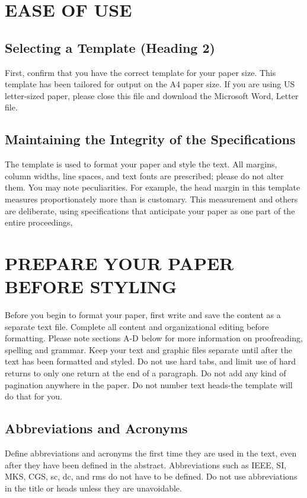 \documentclass[journal,onecolumn]{IEEEtran}
\begin{document}
\section{EASE OF USE}
\subsection{Selecting a Template (Heading 2)}
First, confirm that you have the correct template for your paper size. This template has been tailored for output on the A4 paper size. If you are using US letter-sized paper, please close this file and download the Microsoft Word, Letter file.	
\subsection{Maintaining the Integrity of the Specifications}
The template is used to format your paper and style the text. All margins, column widths, line spaces, and text fonts are prescribed; please do not alter them. You may note peculiarities. For example, the head margin in this template measures proportionately more than is customary. This measurement and others are deliberate, using specifications that anticipate your paper as one part of the entire proceedings,
\section{PREPARE YOUR PAPER BEFORE STYLING}
Before you begin to format your paper, first write and save the content as a separate text file. Complete all content and organizational editing before formatting. Please note sections A-D below for more information on proofreading, spelling and grammar.
Keep your text and graphic files separate until after the text has been formatted and styled. Do not use hard tabs, and limit use of hard returns to only one return at the end of a paragraph. Do not add any kind of pagination anywhere in the paper. Do not number text heads-the template will do that for you.
\subsection{Abbreviations and Acronyms}
Define abbreviations and acronyms the first time they are used in the text, even after they have been defined in the abstract. Abbreviations such as IEEE, SI, MKS, CGS, sc, dc, and rms do not have to be defined. Do not use abbreviations in the title or heads unless they are unavoidable.
\end{document}
